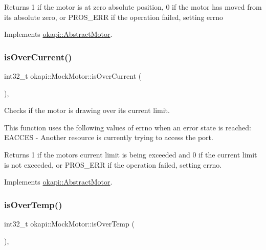\begin{DoxyReturn}{Returns}
1 if the motor is at zero absolute position, 0 if the motor has moved from its absolute zero, or P\+R\+O\+S\+\_\+\+E\+RR if the operation failed, setting errno 
\end{DoxyReturn}


Implements \mbox{\hyperlink{classokapi_1_1AbstractMotor_a07079ee87a07b98b7008f2ce91c645ea}{okapi\+::\+Abstract\+Motor}}.

\mbox{\label{classokapi_1_1MockMotor_a73372bc2b71a7745c281245a6b37e14a}} 
\subsubsection{\texorpdfstring{isOverCurrent()}{isOverCurrent()}}
{\footnotesize\ttfamily int32\+\_\+t okapi\+::\+Mock\+Motor\+::is\+Over\+Current (\begin{DoxyParamCaption}{ }\end{DoxyParamCaption})\hspace{0.3cm}{\ttfamily [override]}, {\ttfamily [virtual]}}



Checks if the motor is drawing over its current limit. 

This function uses the following values of errno when an error state is reached\+: E\+A\+C\+C\+ES -\/ Another resource is currently trying to access the port.

\begin{DoxyReturn}{Returns}
1 if the motor\textquotesingle{}s current limit is being exceeded and 0 if the current limit is not exceeded, or P\+R\+O\+S\+\_\+\+E\+RR if the operation failed, setting errno. 
\end{DoxyReturn}


Implements \mbox{\hyperlink{classokapi_1_1AbstractMotor_a3d365496ebb8566c0a12611f090c5231}{okapi\+::\+Abstract\+Motor}}.

\mbox{\label{classokapi_1_1MockMotor_af8475d8e872bb902e9d860e8b9950e1a}} 
\subsubsection{\texorpdfstring{isOverTemp()}{isOverTemp()}}
{\footnotesize\ttfamily int32\+\_\+t okapi\+::\+Mock\+Motor\+::is\+Over\+Temp (\begin{DoxyParamCaption}{ }\end{DoxyParamCaption})\hspace{0.3cm}{\ttfamily [override]}, {\ttfamily [virtual]}}



